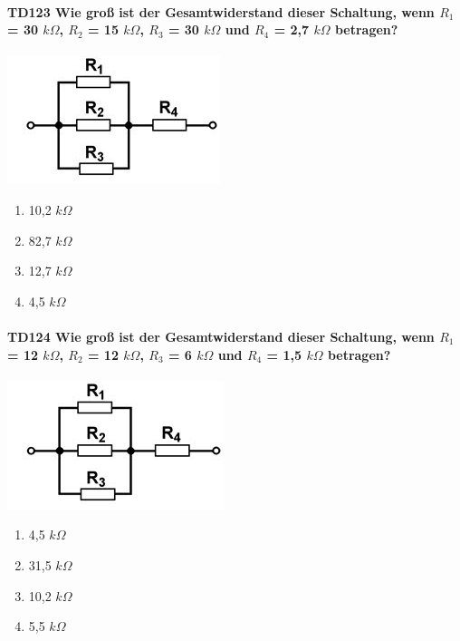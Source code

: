 \documentclass[8pt]{article}
\begin{document}
\begin{enumerate}
\begin{enumerate}[nolistsep,label=\Alph*]
{\paragraph*{TD123 Wie groß ist der Gesamtwiderstand dieser Schaltung, wenn $R_{1}$ = 30 $k\Omega$, $R_{2}$ = 15 $k\Omega$, $R_{3}$ = 30 $k\Omega$ und $R_{4}$ = 2,7 $k\Omega$ betragen?}
\begin{center}
	\begin{minipage}{\linewidth}
		\centering
		\includegraphics[scale=1.0]{pics/td123_a.jpg}
	\end{minipage}
\end{center}
\begin{enumerate}[nolistsep,label=\Alph*]
\item 10,2 $k\Omega$
\item 82,7 $k\Omega$
\item 12,7 $k\Omega$
\item 4,5 $k\Omega$
\end{enumerate}

\paragraph*{TD124 Wie groß ist der Gesamtwiderstand dieser Schaltung, wenn $R_{1}$ = 12 $k\Omega$, $R_{2}$ = 12 $k\Omega$, $R_{3}$ = 6 $k\Omega$ und $R_{4}$ = 1,5 $k\Omega$ betragen?}
\begin{center}
	\begin{minipage}{\linewidth}
		\centering
		\includegraphics[scale=1.0]{pics/td124_a.jpg}
	\end{minipage}
\end{center}
\begin{enumerate}[nolistsep,label=\Alph*]
\item 4,5 $k\Omega$
\item 31,5 $k\Omega$
\item 10,2 $k\Omega$
\item 5,5 $k\Omega$
\end{enumerate}

}
\end{enumerate}
\end{enumerate}
\end{document}
